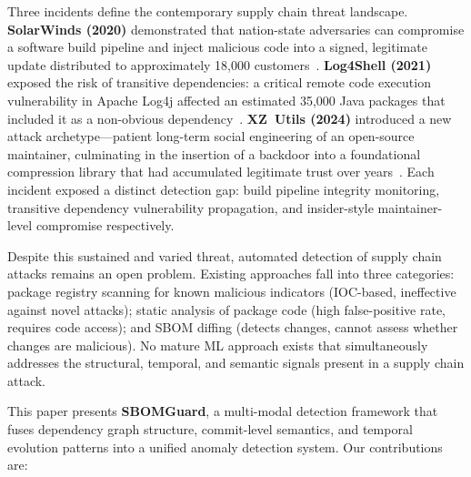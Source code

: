 \documentclass[sigconf,nonacm]{acmart}
\begin{document}
Three incidents define the contemporary supply chain threat landscape.
\textbf{SolarWinds (2020)} demonstrated that nation-state adversaries can compromise
a software build pipeline and inject malicious code into a signed, legitimate update
distributed to approximately 18,000 customers~\cite{pearlson2021solarwinds}.
\textbf{Log4Shell (2021)} exposed the risk of transitive dependencies: a critical
remote code execution vulnerability in Apache Log4j affected an estimated 35,000
Java packages that included it as a non-obvious
dependency~\cite{chen2022log4shell}. \textbf{XZ~Utils (2024)} introduced a new
attack archetype---patient long-term social engineering of an open-source
maintainer, culminating in the insertion of a backdoor into a foundational
compression library that had accumulated legitimate trust over
years~\cite{boehs2024xz}. Each incident exposed a distinct detection gap: build
pipeline integrity monitoring, transitive dependency vulnerability propagation, and
insider-style maintainer-level compromise respectively.

Despite this sustained and varied threat, automated detection of supply chain attacks
remains an open problem. Existing approaches fall into three categories: package
registry scanning for known malicious indicators (IOC-based, ineffective against
novel attacks); static analysis of package code (high false-positive rate, requires
code access); and SBOM diffing (detects changes, cannot assess whether changes are
malicious). No mature ML approach exists that simultaneously addresses the structural,
temporal, and semantic signals present in a supply chain attack.

This paper presents \textbf{SBOMGuard}, a multi-modal detection framework that fuses
dependency graph structure, commit-level semantics, and temporal evolution patterns
into a unified anomaly detection system. Our contributions are:
\end{document}
